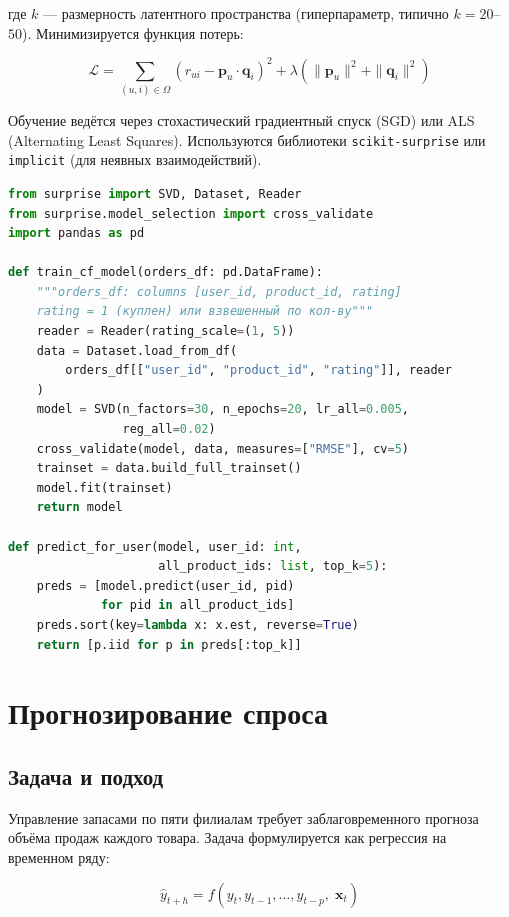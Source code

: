 \documentclass[14pt,a4paper]{extreport}
\begin{document}
где $k$ --- размерность латентного пространства (гиперпараметр, типично $k = 20$--$50$). Минимизируется функция потерь:

\begin{equation}
  \mathcal{L} = \sum_{(u,i) \in \Omega} (r_{ui} - \mathbf{p}_u \cdot \mathbf{q}_i)^2
             + \lambda(\|\mathbf{p}_u\|^2 + \|\mathbf{q}_i\|^2)
\end{equation}

Обучение ведётся через стохастический градиентный спуск (SGD) или ALS (Alternating Least Squares). Используются библиотеки \texttt{scikit-surprise} или \texttt{implicit} (для неявных взаимодействий).

\begin{lstlisting}[language=Python, caption={Collaborative Filtering через SVD (scikit-surprise)}]
from surprise import SVD, Dataset, Reader
from surprise.model_selection import cross_validate
import pandas as pd

def train_cf_model(orders_df: pd.DataFrame):
    """orders_df: columns [user_id, product_id, rating]
    rating = 1 (куплен) или взвешенный по кол-ву"""
    reader = Reader(rating_scale=(1, 5))
    data = Dataset.load_from_df(
        orders_df[["user_id", "product_id", "rating"]], reader
    )
    model = SVD(n_factors=30, n_epochs=20, lr_all=0.005,
                reg_all=0.02)
    cross_validate(model, data, measures=["RMSE"], cv=5)
    trainset = data.build_full_trainset()
    model.fit(trainset)
    return model

def predict_for_user(model, user_id: int,
                     all_product_ids: list, top_k=5):
    preds = [model.predict(user_id, pid)
             for pid in all_product_ids]
    preds.sort(key=lambda x: x.est, reverse=True)
    return [p.iid for p in preds[:top_k]]
\end{lstlisting}

\section{Прогнозирование спроса}

\subsection{Задача и подход}

Управление запасами по пяти филиалам требует заблаговременного прогноза объёма продаж каждого товара. Задача формулируется как регрессия на временном ряду:

\begin{equation}
  \hat{y}_{t+h} = f(y_t, y_{t-1}, \ldots, y_{t-p},\; \mathbf{x}_t)
\end{equation}
\end{document}
